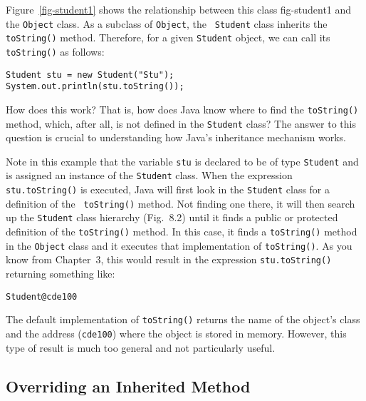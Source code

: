 \noindent Figure~\ref{fig-student1} shows the relationship between this class
{fig-student1}
and the {\tt Object} class.  As a subclass of {\tt Object}, the {\tt
Student} class inherits the {\tt toString()} method. Therefore, for a
given {\tt Student} object, we can call its {\tt toString()} as
follows:

\begin{jjjlisting}
\begin{lstlisting}
Student stu = new Student("Stu");
System.out.println(stu.toString());
\end{lstlisting}
\end{jjjlisting}

\noindent How does this work? That is, how does Java know where to
find the {\tt toString()} method, which, after all, is not defined in
the {\tt Student} class?  The answer to this question is crucial to
understanding how Java's inheritance mechanism works.  

Note in this example that the variable {\tt stu} is declared to be of
type {\tt Student} and is assigned an instance of the {\tt Student}
class. When the expression {\tt stu.toString()} is executed, Java will
first look in the {\tt Student} class for a definition of the {\tt
toString()} method. Not finding one there, it will then search up the
{\tt Student} class hierarchy (Fig.~8.2) until it finds a public or
protected definition of the {\tt toString()} method. In this case, it
finds a {\tt toString()} method in the {\tt Object} class and it
executes that implementation of {\tt toString()}.  As you know from
Chapter~3, this would result in the expression {\tt stu.toString()}
returning something like:

\begin{jjjlisting}
\begin{lstlisting}
Student@cde100
\end{lstlisting}
\end{jjjlisting}

\noindent The default implementation of {\tt toString()} returns the
name of the object's class and the address ({\tt cde100}) where the
object is stored in memory. However, this type of result is much too
general and not particularly useful.

\subsection{Overriding an Inherited Method}


